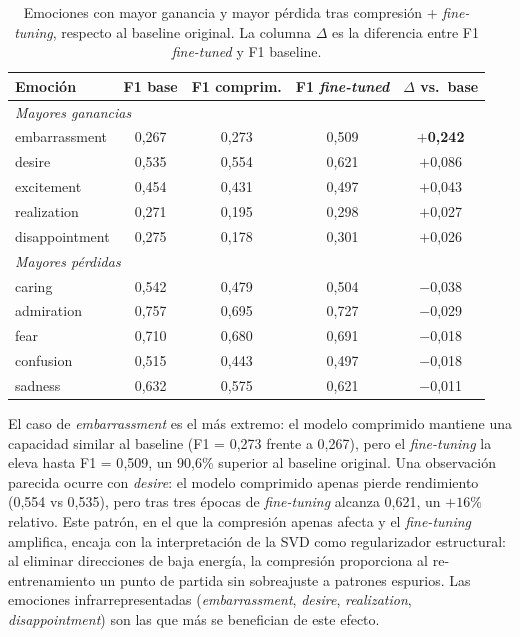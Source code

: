 \begin{table}[ht]
\centering
\caption{Emociones con mayor ganancia y mayor pérdida tras compresión +
\emph{fine-tuning}, respecto al baseline original. La columna $\Delta$ es la
diferencia entre F1 \emph{fine-tuned} y F1 baseline.}
\label{tab:finetuning-emotions}
\small
\begin{tabular}{lcccc}
\toprule
\textbf{Emoción} & \textbf{F1 base} & \textbf{F1 comprim.} & \textbf{F1 \emph{fine-tuned}} & \textbf{$\Delta$ vs.\ base} \\
\midrule
\multicolumn{5}{l}{\emph{Mayores ganancias}} \\
embarrassment & 0{,}267 & 0{,}273 & 0{,}509 & \textbf{$+$0{,}242} \\
desire        & 0{,}535 & 0{,}554 & 0{,}621 & $+$0{,}086 \\
excitement    & 0{,}454 & 0{,}431 & 0{,}497 & $+$0{,}043 \\
realization   & 0{,}271 & 0{,}195 & 0{,}298 & $+$0{,}027 \\
disappointment & 0{,}275 & 0{,}178 & 0{,}301 & $+$0{,}026 \\
\midrule
\multicolumn{5}{l}{\emph{Mayores pérdidas}} \\
caring        & 0{,}542 & 0{,}479 & 0{,}504 & $-$0{,}038 \\
admiration    & 0{,}757 & 0{,}695 & 0{,}727 & $-$0{,}029 \\
fear          & 0{,}710 & 0{,}680 & 0{,}691 & $-$0{,}018 \\
confusion     & 0{,}515 & 0{,}443 & 0{,}497 & $-$0{,}018 \\
sadness       & 0{,}632 & 0{,}575 & 0{,}621 & $-$0{,}011 \\
\bottomrule
\end{tabular}
\end{table}

El caso de \emph{embarrassment} es el más extremo: el modelo comprimido
mantiene una capacidad similar al baseline (F1 = 0{,}273 frente a 0{,}267),
pero el \emph{fine-tuning} la eleva hasta F1 = 0{,}509, un 90{,}6\% superior al
baseline original. Una observación parecida ocurre con \emph{desire}: el
modelo comprimido apenas pierde rendimiento (0{,}554 vs 0{,}535), pero
tras tres épocas de \emph{fine-tuning} alcanza 0{,}621, un $+16\%$ relativo.
Este patrón, en el que la compresión apenas afecta y el \emph{fine-tuning}
amplifica, encaja con la interpretación de la SVD como
regularizador estructural: al eliminar direcciones de baja energía, la
compresión proporciona al re-entrenamiento un punto de partida sin
sobreajuste a patrones espurios. Las emociones infrarrepresentadas
(\emph{embarrassment}, \emph{desire}, \emph{realization},
\emph{disappointment}) son las que más se benefician de este efecto.

